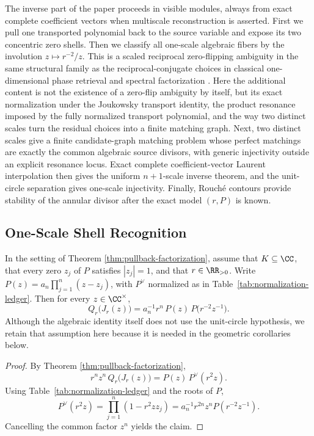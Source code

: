 The inverse part of the paper proceeds in visible modules, always from
exact complete coefficient vectors when multiscale reconstruction is
asserted.  First we pull one transported polynomial back to the source
variable and expose its two concentric zero shells.  Then we classify
all one-scale algebraic fibers by the involution \(z\mapsto r^{-2}/z\).
This is a scaled reciprocal zero-flipping ambiguity in the same
structural family as the reciprocal-conjugate choices in classical
one-dimensional phase retrieval and spectral factorization
\citep{Akutowicz1956,Walther1963,Hofstetter1964,Hayes1982,OppenheimSchafer2010}.
Here the additional content is not the existence of a zero-flip
ambiguity by itself, but its exact normalization under the Joukowsky
transport identity, the product resonance imposed by the fully
normalized transport polynomial, and the way two distinct scales turn
the residual choices into a finite matching graph.
Next, two distinct scales give a finite candidate-graph matching
problem whose perfect matchings are exactly the common algebraic
source divisors, with generic injectivity outside an explicit
resonance locus.  Exact complete coefficient-vector Laurent
interpolation then gives the uniform \(n+1\)-scale inverse theorem,
and the unit-circle separation gives one-scale injectivity.  Finally,
Rouch\'e contours provide stability of the annular divisor after the
exact model \((r,P)\) is known.

\subsection{One-Scale Shell Recognition}\label{subsec:one-scale-shell-recognition}

\begin{corollary}\label{cor:leyang-transport-identity}
In the setting of Theorem \ref{thm:pullback-factorization}, assume that \(K\subseteq\CC\), that every zero \(z_j\) of \(P\) satisfies \(|z_j|=1\), and that \(r\in\RR_{>0}\).  Write \(P(z)=a_n\prod_{j=1}^{n}(z-z_j)\), with \(P^\vee\) normalized as in Table~\ref{tab:normalization-ledger}.
Then for every \(z\in\CC^\times\),
\[
Q_r\!\bigl(J_r(z)\bigr)=a_n^{-1}r^n\,P(z)\,P\!\bigl(r^{-2}z^{-1}\bigr).
\]
Although the algebraic identity itself does not use the unit-circle hypothesis, we retain that assumption here because it is needed in the geometric corollaries below.
\end{corollary}

\begin{proof}
By Theorem \ref{thm:pullback-factorization},
\[
r^n z^n\,Q_r\!\bigl(J_r(z)\bigr)=P(z)\,P^{\vee}(r^2 z).
\]
Using Table~\ref{tab:normalization-ledger} and the roots of \(P\),
\[
P^{\vee}(r^2 z)
=\prod_{j=1}^{n}(1-r^2zz_j)
=a_n^{-1}r^{2n}z^n P(r^{-2}z^{-1}).
\]
Cancelling the common factor \(z^n\) yields the claim.
\end{proof}

